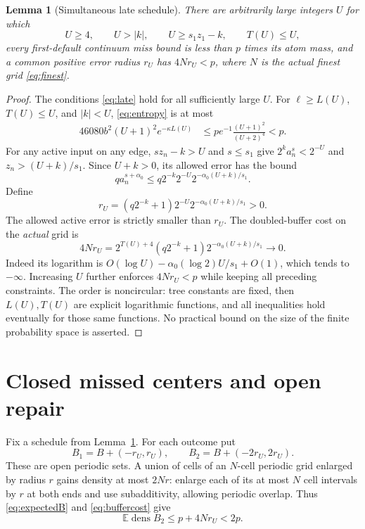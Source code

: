 \documentclass[11pt]{article}
\newtheorem{lemma}[theorem]{Lemma}
\theoremstyle{definition}
\theoremstyle{remark}
\newcommand{\dens}{\operatorname{dens}}
\begin{document}
\begin{lemma}[Simultaneous late schedule]\label{lem:schedule}
There are arbitrarily large integers $U$ for which
\begin{equation}\label{eq:late}
 U\geq4,\qquad U>|k|,\qquad U\geq s_1z_1-k,\qquad T(U)\leq U,
\end{equation}
every first-default continuum miss bound is less than $p$ times its atom mass,
and a common positive error radius $r_U$ has $4Nr_U<p$, where $N$ is the
actual finest grid \eqref{eq:finest}.
\end{lemma}
\begin{proof}
The conditions \eqref{eq:late} hold for all sufficiently large $U$.
For $\ell\geq L(U)$, $T(U)\leq U$, and $|k|<U$, \eqref{eq:entropy} is at most
\begin{align}
 46080b^2(U+1)^2e^{-\kappa L(U)}
 &\leq p e^{-1}\frac{(U+1)^2}{(U+2)^4}<p.\label{eq:smallentropy}
\end{align}
For any active input on any edge, $sz_n-k>U$ and $s\leq s_1$ give
$2^k a_n^s<2^{-U}$ and $z_n>(U+k)/s_1$. Since $U+k>0$, its allowed error
has the bound
\[
 q a_n^{s+\alpha_0}
 \leq q2^{-k}2^{-U}2^{-\alpha_0(U+k)/s_1}.
\]
Define
\begin{equation}\label{eq:radius}
 r_U=(q2^{-k}+1)2^{-U}2^{-\alpha_0(U+k)/s_1}>0.
\end{equation}
The allowed active error is strictly smaller than $r_U$. The doubled-buffer
cost on the \emph{actual} grid is
\begin{equation}\label{eq:buffercost}
 4Nr_U=2^{T(U)+4}(q2^{-k}+1)2^{-\alpha_0(U+k)/s_1}\longrightarrow0.
\end{equation}
Indeed its logarithm is $O(\log U)-\alpha_0(\log2)U/s_1+O(1)$, which tends
to $-\infty$. Increasing $U$ further enforces $4Nr_U<p$ while keeping all
preceding constraints. The order is noncircular: tree constants are fixed,
then $L(U),T(U)$ are explicit logarithmic functions, and all inequalities
hold eventually for those same functions. No practical bound on the size
of the finite probability space is asserted.
\end{proof}

\section{Closed missed centers and open repair}\label{sec:repair}
Fix a schedule from Lemma~\ref{lem:schedule}. For each outcome put
\[
 B_1=B+(-r_U,r_U),\qquad B_2=B+(-2r_U,2r_U).
\]
These are open periodic sets. A union of cells of an $N$-cell periodic grid
enlarged by radius $r$ gains density at most $2Nr$: enlarge each of its at
most $N$ cell intervals by $r$ at both ends and use subadditivity, allowing
periodic overlap. Thus \eqref{eq:expectedB} and \eqref{eq:buffercost} give
\begin{equation}\label{eq:expectedbuffer}
 \mathbb E\dens B_2\leq p+4Nr_U<2p.
\end{equation}
\end{document}
